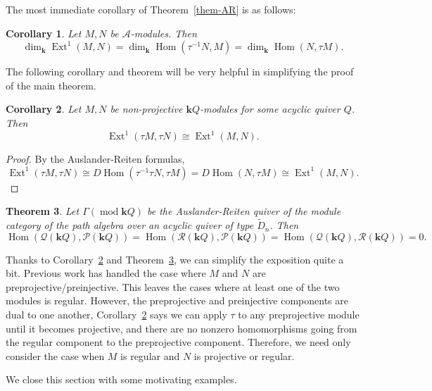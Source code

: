 \documentclass[11pt]{amsart}
\theoremstyle{plain}
\newtheorem{theorem}{Theorem}[section]
\newtheorem{corollary}[theorem]{Corollary}
\theoremstyle{definition}
\numberwithin{equation}{section}
\renewcommand{\k}{\mathbf{k}}
\renewcommand{\mod}{\operatorname{mod}}
\newcommand{\Hom}{\operatorname{Hom}}
\newcommand{\Ext}{\operatorname{Ext}}
\begin{document}
The most immediate corollary of Theorem~\ref{them-AR} is as follows:

\begin{corollary} \label{ext-hom}
    Let $M,N$ be $\mathcal{A}$-modules. Then $$\dim_\k \Ext^1(M,N) = \dim_\k \Hom(\tau^{-1}N, M) = \dim_\k \Hom (N,\tau M).$$
\end{corollary}

The following corollary and theorem will be very helpful in simplifying the proof of the main theorem.

\begin{corollary} \label{ext-tau-invariant}
    Let $M,N$ be non-projective $\k Q$-modules for some acyclic quiver $Q$. Then $$\Ext^1(\tau M,\tau N) \cong \Ext^1(M,N).$$
\end{corollary}

\begin{proof}
    By the Auslander-Reiten formulas, $$\Ext^1(\tau M,\tau N) \cong D \Hom (\tau^{-1} \tau N, \tau M) =  D \Hom (N, \tau M) \cong \Ext^1(M,N).$$
\end{proof}

\begin{theorem}\label{thm-0-homs}
    Let $\Gamma(\mod \k Q )$ be the Auslander-Reiten quiver of the module category of the path algebra over an acyclic quiver of type $\widetilde{D}_n$. 
    Then \[ \Hom (\mathcal{Q}(\k Q) ,\mathcal{P}(\k Q)) = \Hom (\mathcal{R}(\k Q) ,\mathcal{P}(\k Q)) = \Hom (\mathcal{Q}(\k Q) ,\mathcal{R}(\k Q)) = 0. \]
\end{theorem}

Thanks to Corollary~\ref{ext-tau-invariant} and Theorem~\ref{thm-0-homs}, we can simplify the exposition quite a bit.
Previous work has handled the case where $M$ and $N$ are preprojective/preinjective. 
This leaves the cases where at least one of the two modules is regular. However, the preprojective and preinjective components are dual to one another, Corollary~\ref{ext-tau-invariant} says we can apply $\tau$ to any preprojective module until it becomes projective, and there are no nonzero homomorphisms going from the regular component to the preprojective component.
Therefore, we need only consider the case when $M$ is regular and $N$ is projective or regular.

We close this section with some motivating examples. 
\end{document}
